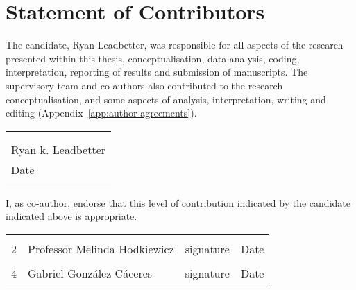 \chapter*{Statement of Contributors} 

The candidate, Ryan Leadbetter, was responsible for all aspects of the research presented within this thesis, conceptualisation, data analysis, coding, interpretation, reporting of results and submission of manuscripts.
The supervisory team and co-authors also contributed to the research conceptualisation, and some aspects of analysis, interpretation, writing and editing (Appendix~\ref{app:author-agreements}).

\vspace{25mm}
\begin{tabular}{@{}p{2.5in}@{}}
\hrulefill \\
\\
Ryan k. Leadbetter \\
Date\\
\\
\end{tabular}

I, as co-author, endorse that this level of contribution indicated by the candidate indicated above is appropriate.

\begin{table}
  \centering
  \begin{tabularx}{\textwidth}{lYYY}
  \toprule
   &  &  & \\
  2 & Professor Melinda Hodkiewicz & signature & Date\\
   &  &  & \\
  4 & Gabriel Gonz\'{a}lez C\'{a}ceres & signature & Date\\

  \bottomrule
  \end{tabularx}
\end{table}
